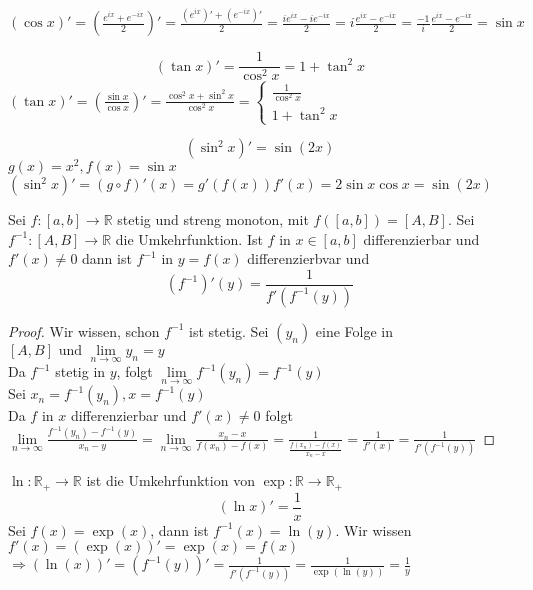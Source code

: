 \documentclass[a4paper,titlepage,oneside]{article}
\def\R{\ensuremath{\mathbb{R}} }
\def\im{\ensuremath{\mathit{i}} }
\def\e{\ensuremath{\mathit{e}} }
\renewcommand{\liminf}[2][n]{\ensuremath{\lim\limits_{#1 \rightarrow \infty}{#2}}}
\theoremstyle{thmstyle}
\begin{document}
\begin{bsp}
$\displaystyle  (\cos x)' = \left( \frac{\e^{\im x} + \e^{-\im x}}{2}\right)' = \frac{(\e^{\im x})' + (\e^{-\im x})'}{2} = \frac{\im \e^{\im x} - \im \e^{-\im x}}{2} = \im \frac{\e^{\im x} - \e^{-\im x}}{2} =  \frac{-1}{\im} \frac{\e^{\im x} - \e^{-\im x}}{2} = \sin x $
\item \[ (\tan x)' = \frac{1}{\cos^2  x} = 1 + \tan^2 x\]
$(\tan x)' = \left( \frac{\sin x}{\cos x} \right)' = \frac{\cos^2 x + \sin^2 x}{\cos^2 x} =\begin{cases} \frac{1}{\cos^2  x} \\ 1 + \tan^2 x \end{cases}$
\item \[(\sin^2 x)' = \sin (2x)\]
$g(x) = x^2, f(x) = \sin x$ \\
$(\sin^2 x)' = (g \circ f)'(x) = g'(f(x))f'(x) = 2 \sin x \cos x = \sin (2x)$
\end{bsp}

\begin{satz}
Sei $f : [a,b] \to \R $ stetig und streng monoton, mit $f([a,b]) = [A,B]$. Sei $f^{-1} : [A,B] \to \R$ die Umkehrfunktion.
Ist $f$ in $x \in [a,b]$ differenzierbar und $f'(x) \ne 0$ dann ist $f^{-1}$ in $y = f(x)$ differenzierbvar und \[(f^{-1})' (y) = \frac{1}{f'(f^{-1}(y))}\]
\begin{proof}
Wir wissen, schon $f^{-1}$ ist stetig. Sei $(y_n)$ eine Folge in $[A, B] \text{ und } \liminf{y_n} = y$\\
Da $f^{-1}$ stetig in $y$, folgt $\liminf{f^{-1}(y_n)} = f^{-1}(y)$\\
Sei $x_n = f^{-1}(y_n), x= f^{-1}(y)$\\
Da $f$ in $x$ differenzierbar und $f'(x) \ne 0$ folgt $\liminf{\frac{f^{-1}(y_n) - f^{-1}(y)}{x_n - y}} = \liminf{\frac{x_n - x}{f(x_n)-f(x)}} = \frac{1}{\frac{f(x_n) - f(x)}{x_n - x}} = \frac{1}{f'(x)} = \frac{1}{f'(f^{-1}(y))}$
\end{proof}
\end{satz}

\begin{bsp}
$\ln : \R_+ \to \R$ ist die Umkehrfunktion von $\exp: \R \to \R_+$
\[(\ln x)' = \frac{1}{x}\]
Sei $f(x) = \exp(x)$, dann ist $f^{-1}(x) = \ln(y)$. Wir wissen $f'(x) = (\exp(x))' = \exp(x) = f(x)$
$\Rightarrow (\ln(x))' = (f^{-1}(y))' = \frac{1}{f'(f^{-1}(y))} = \frac{1}{\exp(\ln(y))} = \frac{1}{y}$
\end{bsp}
\end{document}
